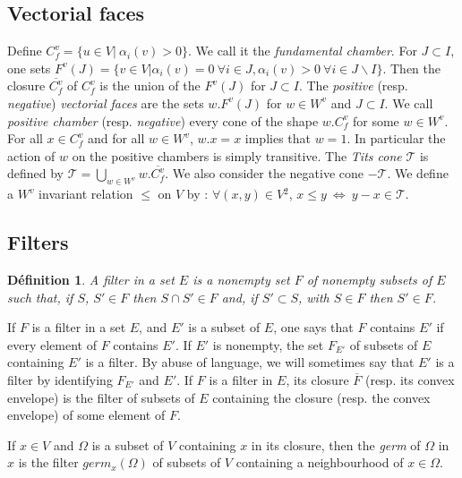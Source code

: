 \documentclass[12pt]{article}
\theoremstyle{plain}
\newtheorem{defin}[thm]{Définition}
\theoremstyle{definition}
\begin{document}
\subsection{Vectorial faces}

Define $C_f^v=\{u\in V|\ \alpha_i(v)>0\}$. We call it the \textit{fundamental chamber}. For $J\subset I$, one sets $F^v(J)=\{v\in V|\alpha_i(v)=0\ \forall i\in J,\alpha_i(v)>0\ \forall i\in J\backslash I\}$. Then the closure $\overline{C_f^v}$ of $C_f^v$ is the union of the $F^v(J)$ for $J\subset I$. The \textit{positive} (resp. \textit{negative}) \textit{vectorial faces} are the sets $w.F^v(J)$ for $w\in W^v$ and $J\subset I$.  We call \textit{positive chamber} (resp. \textit{negative}) every cone  of the shape $w.C_f^v$ for some $w\in W^v$.  For all $x\in C_f^v$ and for all $w\in W^v$, $w.x=x$ implies that $w=1$. In particular the action of $w$ on the positive chambers is simply transitive. The \textit{Tits cone} $\mathcal T$ is defined by $\mathcal{T}=\bigcup_{w\in W^v} w.\overline{C^v_f}$. We also consider the negative cone $-\mathcal{T}$.
We define a $W^v$ invariant relation $\leq$ on $V$ by : $\forall (x,y)\in V\mathrm{}^2$, $x\leq y\ \Leftrightarrow\ y-x\in \mathcal{T}$.


\subsection{Filters}

\begin{defin}
A filter in a set $E$ is a nonempty set $F$ of nonempty subsets of $E$ such that, if $S$, $S'\in F$ then $S\cap S'\in F$ and, if $S'\subset S$, with $S\in F$ then $S'\in F$.
\end{defin}

If $F$ is a filter in a set $E$, and $E'$ is a subset of $E$, one says that $F$ contains $E'$ if every element of $F$ contains $E'$. If $E'$ is nonempty, the set $F_{E'}$ of subsets of $E$ containing $E'$ is a filter. By abuse of language, we will sometimes say that $E'$ is a filter by identifying $F_{E'}$ and $E'$. If $F$ is a filter in $E$, its closure $\overline F$ (resp. its convex envelope) is the filter of subsets of $E$ containing the closure (resp. the convex envelope) of some element of $F$.

If $x\in V\mathrm{}$ and $\Omega$ is a subset of $V$ containing $x$ in its closure, then the \textit{germ} of $\Omega$ in $x$ is the filter $germ_x(\Omega)$ of subsets of $V$ containing a neighbourhood of $x\in \Omega$.
\end{document}
